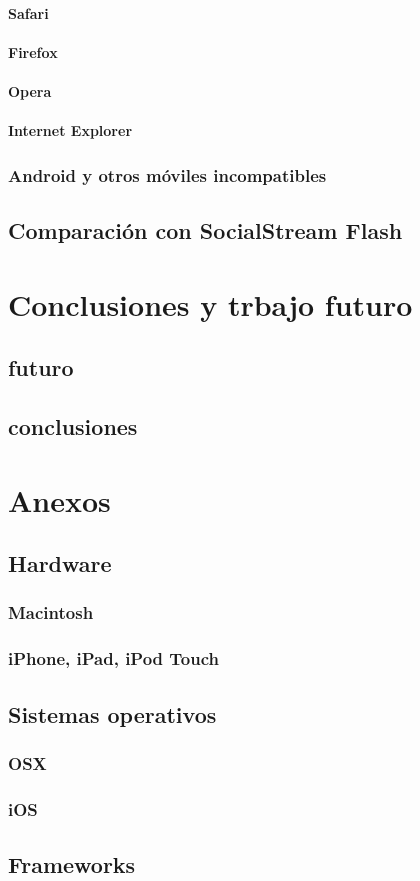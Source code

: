 		\subsubsection{Safari}
		\subsubsection{Firefox}
		\subsubsection{Opera}
		\subsubsection{Internet Explorer}
	\subsection{Android y otros móviles incompatibles}
\section{Comparación con SocialStream Flash}

\chapter{Conclusiones y trbajo futuro}
	\section{futuro}
	\section{conclusiones}
	
	
\chapter{Anexos}
	\section{Hardware}
		\subsection{Macintosh}
		\subsection{iPhone, iPad, iPod Touch}
	\section{Sistemas operativos}
		\subsection{OSX}
		\subsection{iOS}
	\section{Frameworks}
